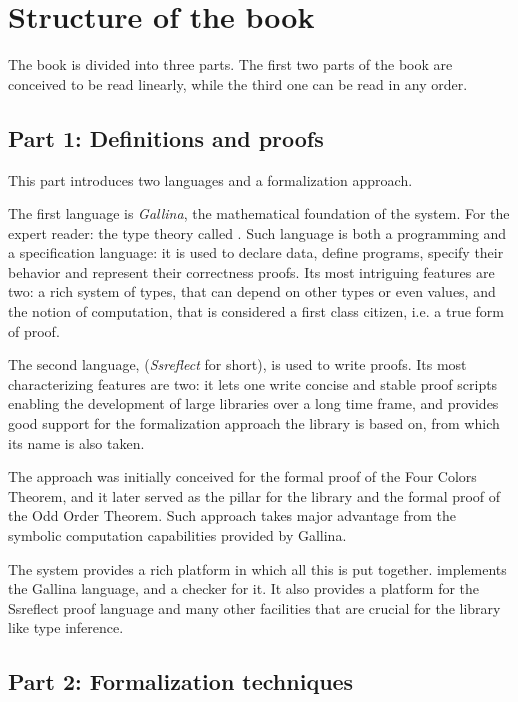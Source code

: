\section{Structure of the book}

The book is divided into three parts.
The first two parts of the book are conceived to be read linearly,
while the third one can be read in any order.

\subsection{Part 1: Definitions and proofs}

This part introduces two languages and a formalization approach.

The first language is \emph{Gallina}, the mathematical foundation of the \Coq{}
system.  For the expert reader: the type theory called \mcbCIC{}.  Such
language is both a programming and a specification language: it is used to
declare data, define programs, specify their behavior and represent their
correctness proofs.  Its most intriguing features are two: a rich system of
types, that can depend on other types or even values, and the notion of
computation, that is considered a first class citizen, i.e. a true form of
proof.

The second language, \mcbSSR{} (\emph{Ssreflect} for short), is used to write
proofs.  Its most characterizing features are two: it lets one write
concise and stable proof scripts enabling the development of large
libraries over a long time frame, and provides good support for the
formalization approach the \mcbMC{} library is based on, from which
its name is also taken.

The \emph{\mcbSSR{}} approach was initially conceived for the formal proof
of the Four Colors Theorem, and it later served as the pillar for
the \mcbMC{} library and the formal proof of the Odd Order Theorem.
Such approach takes major advantage from the symbolic computation
capabilities provided by Gallina.

The \Coq{} system provides a rich platform in which all this is
put together.  \Coq{} implements the Gallina language, and a checker for it.
It also provides a platform for the Ssreflect proof language and
many other facilities that are crucial for the \mcbMC{} library like
type inference.

\subsection{Part 2: Formalization techniques}

